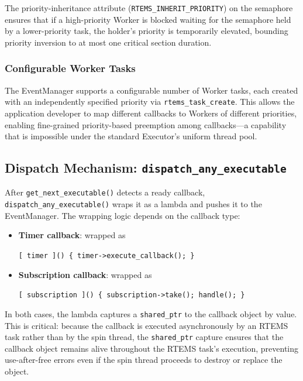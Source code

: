 The priority-inheritance attribute (\texttt{RTEMS\_INHERIT\_PRIORITY}) on the semaphore ensures that if a high-priority Worker is blocked waiting for the semaphore held by a lower-priority task, the holder's priority is temporarily elevated, bounding priority inversion to at most one critical section duration.

\subsubsection{Configurable Worker Tasks}

The EventManager supports a configurable number of Worker tasks, each created with an independently specified priority via \texttt{rtems\_task\_create}.  This allows the application developer to map different callbacks to Workers of different priorities, enabling fine-grained priority-based preemption among callbacks---a capability that is impossible under the standard Executor's uniform thread pool.

\subsection{Dispatch Mechanism: \texttt{dispatch\_any\_executable}}

After \texttt{get\_next\_executable()} detects a ready callback, \texttt{dispatch\_any\_executable()} wraps it as a lambda and pushes it to the EventManager.  The wrapping logic depends on the callback type:

\begin{itemize}
    \item \textbf{Timer callback}: wrapped as
    \begin{center}
    \texttt{[\,timer\,]() \{ timer->execute\_callback(); \}}
    \end{center}
    \item \textbf{Subscription callback}: wrapped as
    \begin{center}
    \texttt{[\,subscription\,]() \{ subscription->take(); handle(); \}}
    \end{center}
\end{itemize}

In both cases, the lambda captures a \texttt{shared\_ptr} to the callback object by value.  This is critical: because the callback is executed asynchronously by an RTEMS task rather than by the spin thread, the \texttt{shared\_ptr} capture ensures that the callback object remains alive throughout the RTEMS task's execution, preventing use-after-free errors even if the spin thread proceeds to destroy or replace the object.

